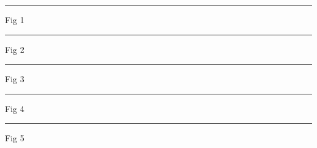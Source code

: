 \documentclass[a4paper,11pt]{article}
\begin{document}
\maketitle
\begin{swarmwrap}%
  \begin{minipage}[t]{4cm}\centering\rule{\linewidth}{6cm}{\footnotesize Fig 1}\end{minipage}%
\end{swarmwrap}%
\swarmwrapnext
\lipsum[1-5]%
\begin{swarmwrap}%
  \begin{minipage}[t]{3cm}\centering\rule{\linewidth}{3cm}{\footnotesize Fig 2}\end{minipage}%
\end{swarmwrap}%
\swarmwrapnext
\lipsum[6-8]%
\begin{swarmwrap}%
  \begin{minipage}[t]{4cm}\centering\rule{\linewidth}{6cm}{\footnotesize Fig 3}\end{minipage}%
\end{swarmwrap}%
\swarmwrapnext
\lipsum[9-13]%
\begin{swarmwrap}%
  \begin{minipage}[t]{2cm}\centering\rule{\linewidth}{2cm}{\footnotesize Fig 4}\end{minipage}%
\end{swarmwrap}%
\swarmwrapnext
\lipsum[14-16]%
\begin{swarmwrap}%
  \begin{minipage}[t]{4cm}\centering\rule{\linewidth}{6cm}{\footnotesize Fig 5}\end{minipage}%
\end{swarmwrap}%
\swarmwrapnext
\lipsum[17-21]%
\end{document}
